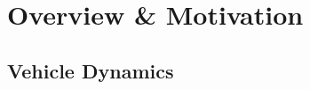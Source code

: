 \documentclass[12pt]{article}
\begin{document}
    \tableofcontents
    
    \newpage

    \section{Overview \& Motivation}

        \subsection{Vehicle Dynamics}


    \autocite{social-media-family}


    \newpage
    \printbibliography[title=Works Cited]

\end{document}
